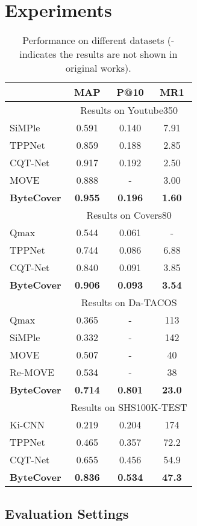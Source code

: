 \documentclass{article}
\begin{document}
  \section{Experiments}
\label{sec:exp}



\begin{table}
  \small
  \centering
  \setlength\tabcolsep{12pt}
  \label{tab:com}
  \begin{tabular}{l c c c}
      \toprule
      & MAP & P@10 & MR1  \\ 
      \midrule
      &\multicolumn{3}{c}{Results on Youtube350} \\
      \hline
      SiMPle \cite{silva2016simple} & 0.591 & 0.140 & 7.91  \\ 
      TPPNet \cite{yu2019temporal}& 0.859 & 0.188 & 2.85  \\
      CQT-Net \cite{yu2020learning} & 0.917 & 0.192 & 2.50  \\
      MOVE~\cite{yesiler2020accurate}  & 0.888 & - & 3.00 \\ 
      \textbf{ByteCover}  & \textbf{0.955} & \textbf{0.196} & \textbf{1.60}  \\ 
      \hline
      &\multicolumn{3}{c}{Results on Covers80} \\
      \hline
      Qmax \cite{serra2009cross} & 0.544 & 0.061 & - \\
TPPNet \cite{yu2019temporal}& 0.744 & 0.086 & 6.88  \\
      CQT-Net \cite{yu2020learning} & 0.840 & 0.091 & 3.85  \\ 
      \textbf{ByteCover} & \textbf{0.906} & \textbf{0.093} & \textbf{3.54}  \\ 
      \hline
      &\multicolumn{3}{c}{Results on Da-TACOS} \\
      \hline
      Qmax~\cite{serra2009cross}  & 0.365 & - & 113  \\
SiMPle\cite{silva2016simple} & 0.332 & - & 142  \\
MOVE \cite{yesiler2020accurate} & 0.507 & - & 40  \\
      Re-MOVE \cite{yesiler2020less} & 0.534 & - & 38  \\
      \textbf{ByteCover} & \textbf{0.714} & \textbf{0.801} & \textbf{23.0}  \\
      \hline
      &\multicolumn{3}{c}{Results on SHS100K-TEST} \\
      \hline
Ki-CNN \cite{xu2018key}& 0.219 & 0.204 & 174  \\ 
      TPPNet \cite{yu2019temporal} & 0.465 & 0.357 & 72.2 \\
      CQT-Net \cite{yu2020learning} & 0.655 & 0.456 & 54.9  \\ 
      \textbf{ByteCover} & \textbf{0.836} & \textbf{0.534} & \textbf{47.3}  \\ 
      \bottomrule
  \end{tabular}
\caption{Performance on different datasets (- indicates the results are not shown in original works).}
\end{table} \subsection{Evaluation Settings}
\label{subsec:dataset}
\end{document}
